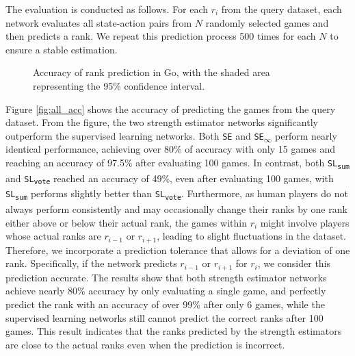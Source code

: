The evaluation is conducted as follows.
For each $r_i$ from the query dataset, each network evaluates all state-action pairs from $N$ randomly selected games and then predicts a rank.
We repeat this prediction process 500 times for each $N$ to ensure a stable estimation.

\begin{figure}[ht]
    \centering
    \caption{Accuracy of rank prediction in Go, with the shaded area representing the 95\% confidence interval.}
    \label{fig:accuracy}
\end{figure}



Figure \ref{fig:all_acc} shows the accuracy of predicting the games from the query dataset.
From the figure, the two strength estimator networks significantly outperform the supervised learning networks.
Both \texttt{SE} and \texttt{SE\textsubscript{$\infty$}} perform nearly identical performance, achieving over 80\% of accuracy with only 15 games and reaching an accuracy of 97.5\% after evaluating 100 games.
In contrast, both \texttt{SL\textsubscript{sum}} and \texttt{SL\textsubscript{vote}} reached an accuracy of 49\%, even after evaluating 100 games, with \texttt{SL\textsubscript{sum}} performs slightly better than \texttt{SL\textsubscript{vote}}.
Furthermore, as human players do not always perform consistently and may occasionally change their ranks by one rank either above or below their actual rank, the games within $r_i$ might involve players whose actual ranks are $r_{i-1}$ or $r_{i+1}$, leading to slight fluctuations in the dataset.
Therefore, we incorporate a prediction tolerance that allows for a deviation of one rank.
Specifically, if the network predicts $r_{i-1}$ or $r_{i+1}$ for $r_i$, we consider this prediction accurate.
The results show that both strength estimator networks achieve nearly 80\% accuracy by only evaluating a single game, and perfectly predict the rank with an accuracy of over 99\% after only 6 games, while the supervised learning networks still cannot predict the correct ranks after 100 games. 
This result indicates that the ranks predicted by the strength estimators are close to the actual ranks even when the prediction is incorrect.

